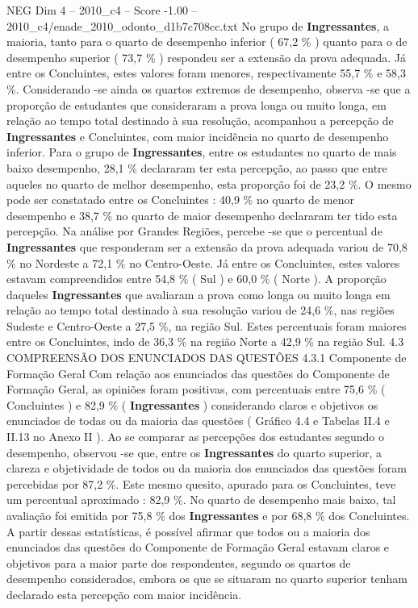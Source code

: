 \begin{textsample}{NEG Dim 4 – 2010\_c4 – Score -1.00 – 2010\_c4/enade\_2010\_odonto\_d1b7c708cc.txt}
No grupo de \textbf{Ingressantes}, a maioria, tanto para o quarto de desempenho inferior ( 67,2 \% ) quanto para o de desempenho superior ( 73,7 \% ) respondeu ser a extensão da prova adequada.
Já entre os Concluintes, estes valores foram menores, respectivamente 55,7 \% e 58,3 \%.
Considerando -se ainda os quartos extremos de desempenho, observa -se que a proporção de estudantes que consideraram a prova longa ou muito longa, em relação ao tempo total destinado à sua resolução, acompanhou a percepção de \textbf{Ingressantes} e Concluintes, com maior incidência no quarto de desempenho inferior.
Para o grupo de \textbf{Ingressantes}, entre os estudantes no quarto de mais baixo desempenho, 28,1 \% declararam ter esta percepção, ao passo que entre aqueles no quarto de melhor desempenho, esta proporção foi de 23,2 \%.
O mesmo pode ser constatado entre os Concluintes : 40,9 \% no quarto de menor desempenho e 38,7 \% no quarto de maior desempenho declararam ter tido esta percepção.
Na análise por Grandes Regiões, percebe -se que o percentual de \textbf{Ingressantes} que responderam ser a extensão da prova adequada variou de 70,8 \% no Nordeste a 72,1 \% no Centro-Oeste.
Já entre os Concluintes, estes valores estavam compreendidos entre 54,8 \% ( Sul ) e 60,0 \% ( Norte ).
A proporção daqueles \textbf{Ingressantes} que avaliaram a prova como longa ou muito longa em relação ao tempo total destinado à sua resolução variou de 24,6 \%, nas regiões Sudeste e Centro-Oeste a 27,5 \%, na região Sul.
Estes percentuais foram maiores entre os Concluintes, indo de 36,3 \% na região Norte a 42,9 \% na região Sul. 4.3 COMPREENSÃO DOS ENUNCIADOS DAS QUESTÕES 4.3.1 Componente de Formação Geral Com relação aos enunciados das questões do Componente de Formação Geral, as opiniões foram positivas, com percentuais entre 75,6 \% ( Concluintes ) e 82,9 \% ( \textbf{Ingressantes} ) considerando claros e objetivos os enunciados de todas ou da maioria das questões ( Gráfico 4.4 e Tabelas II.4 e II.13 no Anexo II ).
Ao se comparar as percepções dos estudantes segundo o desempenho, observou -se que, entre os \textbf{Ingressantes} do quarto superior, a clareza e objetividade de todos ou da maioria dos enunciados das questões foram percebidas por 87,2 \%.
Este mesmo quesito, apurado para os Concluintes, teve um percentual aproximado : 82,9 \%.
No quarto de desempenho mais baixo, tal avaliação foi emitida por 75,8 \% dos \textbf{Ingressantes} e por 68,8 \% dos Concluintes.
A partir dessas estatísticas, é possível afirmar que todos ou a maioria dos enunciados das questões do Componente de Formação Geral estavam claros e objetivos para a maior parte dos respondentes, segundo os quartos de desempenho considerados, embora os que se situaram no quarto superior tenham declarado esta percepção com maior incidência.

\end{textsample}
